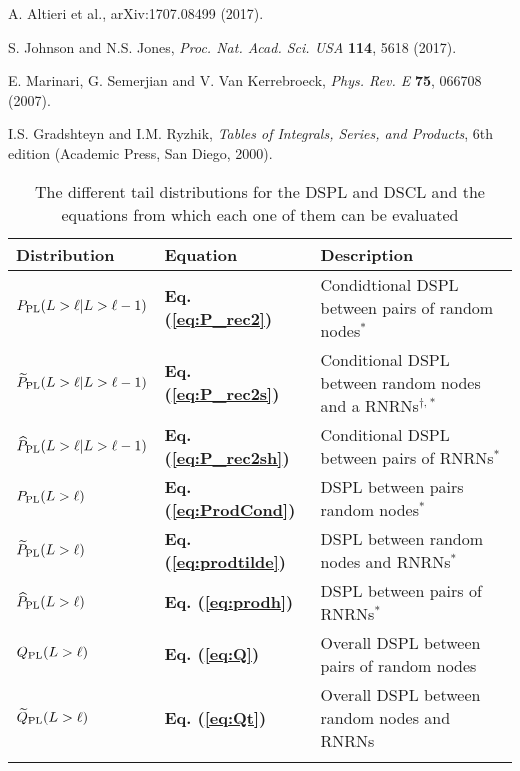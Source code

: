\documentclass[preprint,pre,superscriptaddress,showpacs]{revtex4}
\begin{document}
\begin{thebibliography}{10}
A. Altieri et al.,
arXiv:1707.08499 (2017). 

S. Johnson and N.S. Jones, 
{\it Proc. Nat. Acad. Sci. USA} {\bf 114}, 5618 (2017).


E. Marinari, G. Semerjian and V. Van Kerrebroeck, 
{\it Phys. Rev. E} {\bf 75}, 066708 (2007).

I.S. Gradshteyn and I.M. Ryzhik, 
{\it Tables of Integrals, Series, and Products}, 
6th edition 
(Academic Press, San Diego, 2000).


\end{thebibliography}


\clearpage
\newpage

\begin{table}
\caption{The different tail distributions for the DSPL and DSCL and the
equations from which each one of them can be evaluated}
\begin{tabular}{| l  | l | l | }
\hline \hline
{\bf Distribution}  & {\bf Equation} & {\bf Description}    \\ 
\hline \hline 
$P_{\rm PL}(L>\ell | L>\ell-1)$   &  {\bf Eq. (\ref{eq:P_rec2}) }   & Condidtional DSPL between 
pairs of random nodes$^{\ast}$   \\ \hline
$\widetilde P_{\rm PL}(L>\ell | L>\ell-1)$   &  {\bf Eq. (\ref{eq:P_rec2s}) } &  Conditional DSPL
between random nodes and a RNRNs$^{\dag,}$$^{\ast}$     \\ \hline
$\widehat P_{\rm PL}(L>\ell | L>\ell-1)$   &  {\bf Eq. (\ref{eq:P_rec2sh}) }  & Conditional DSPL
between pairs of RNRNs$^{\ast}$     \\ \hline
\hline
$P_{\rm PL}(L>\ell )$   &  {\bf Eq. (\ref{eq:ProdCond}) }   & DSPL between pairs random nodes$^{\ast}$    \\ \hline
$\widetilde P_{\rm PL}(L>\ell )$   &  {\bf Eq. (\ref{eq:prodtilde}) }   & DSPL between
random nodes and RNRNs$^{\ast}$    \\ \hline
$\widehat P_{\rm PL}(L>\ell )$   &  {\bf Eq. (\ref{eq:prodh}) }   & DSPL between pairs of RNRNs$^{\ast}$     \\ \hline
\hline
$Q_{\rm PL}(L>\ell )$   &  {\bf Eq. (\ref{eq:Q}) }  & Overall DSPL between pairs of random nodes      \\ \hline
$\widetilde Q_{\rm PL}(L>\ell )$   &  {\bf Eq. (\ref{eq:Qt}) }  & Overall DSPL between random
nodes and RNRNs      \\ \hline
$$
\end{tabular}
\end{table}
\end{document}
